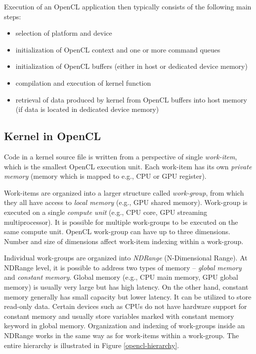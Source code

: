 \documentclass
[
    digital, %
    oneside, %
    table, %
    nolof, %
    nolot, %
    nocover %
]{fithesis3}
\begin{document}
Execution of an OpenCL application then typically consists of the following main steps:
\begin{itemize}
    \item selection of platform and device 
    \item initialization of OpenCL context and one or more command queues
    \item initialization of OpenCL buffers (either in host or dedicated device memory)
    \item compilation and execution of kernel function
    \item retrieval of data produced by kernel from OpenCL buffers into host memory (if data is located in dedicated device memory)
\end{itemize}

\subsection{Kernel in OpenCL}
\label{kernel}
Code in a kernel source file is written from a perspective of single \textit{work-item}, which is the smallest OpenCL execution unit. Each work-item
has its own \textit{private memory} (memory which is mapped to e.g., CPU or GPU register).

Work-items are organized into a larger structure called \textit{work-group}, from which they all have access to \textit{local memory} (e.g., GPU shared
memory). Work-group is executed on a single \textit{compute unit} (e.g., CPU core, GPU streaming multiprocessor). It is possible for multiple work-groups
to be executed on the same compute unit. OpenCL work-group can have up to three dimensions. Number and size of dimensions affect work-item indexing
within a work-group.

Individual work-groups are organized into \textit{NDRange} (N-Dimensional Range). At NDRange level, it is possible to address two types of memory --
\textit{global memory} and \textit{constant memory}. Global memory (e.g., CPU main memory, GPU global memory) is usually very large but has high
latency. On the other hand, constant memory generally has small capacity but lower latency. It can be utilized to store read-only data. Certain devices
such as CPUs do not have hardware support for constant memory and usually store variables marked with constant memory keyword in global memory.
Organization and indexing of work-groups inside an NDRange works in the same way as for work-items within a work-group. The entire hierarchy is
illustrated in Figure \ref{opencl-hierarchy}.
\end{document}
